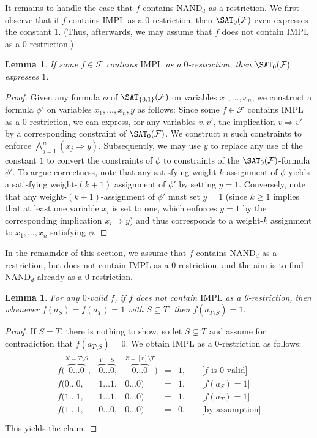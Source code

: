 \documentclass[10pt,a4paper]{article}
\theoremstyle{plain}
\newtheorem{lem}[thm]{Lemma}
\newcommand{\NAND}{\mathrm{NAND}}
\newcommand{\Impl}{\mathrm{IMPL}}
\newcommand{\confam}{\mathcal{F}}
\newcommand{\entry}[1]{#1 \dots #1}
\begin{document}
%
%
It remains to handle the case that $f$ contains $\NAND_d$ as a restriction.
We first observe that if $f$ contains $\Impl$ as a $0$-restriction, then $\SAT_0(\confam)$ even expresses the constant $1$. (Thus, afterwards, we may assume that $f$ does not contain $\Impl$ as a 0-restriction.)
%
\begin{lem}\label{lem:0validexpresses1}
If some $f\in \confam$ contains $\Impl$ as a $0$-restriction, then $\SAT_0(\confam)$ expresses $1$. 
\end{lem}
\begin{proof}
Given any formula $\phi$ of $\SAT_{\{0,1\}}(\confam)$ on variables $x_1,\dots,x_n$, we construct a formula $\phi'$ on variables $x_1,\dots, x_n, y$ as follows: Since some $f\in \confam$ contains $\Impl$ as a $0$-restriction, we can express, for any variables $v,v'$, the implication $v \Rightarrow v'$ by a corresponding constraint of $\SAT_0(\confam)$. We construct $n$ such constraints to enforce $\bigwedge_{j=1}^{n} (x_j\Rightarrow  y)$. Subsequently, we may use $y$ to replace any use of the constant $1$ to convert the constraints of $\phi$ to constraints of the $\SAT_{0}(\confam)$-formula $\phi'$. 
%
To argue correctness, note that any satisfying weight-$k$ assignment of $\phi$ yields a satisfying weight-$(k+1)$ assignment of $\phi'$ by setting $y=1$. Conversely, note that any weight-$(k+1)$-assignment of $\phi'$ must set $y=1$ (since $k\ge 1$ implies that at least one variable $x_i$ is set to one, which enforces $y=1$ by the corresponding implication $x_i \Rightarrow y$) and thus corresponds to a weight-$k$ assignment to $x_1,\dots, x_n$ satisfying $\phi$. 
\end{proof}
%
%
%
%
%
In the remainder of this section, we assume that $f$ contains $\NAND_d$ as a restriction, but does not contain $\Impl$ as a $0$-restriction, and the aim is to find $\NAND_d$ already as a $0$-restriction.
%
%
\begin{lem}\label{lem:subsetdiff}
For any $0$-valid $f$, if $f$ does not contain $\Impl$ as a 0-restriction, then whenever $f(a_S) = f(a_T) = 1$ with $S\subseteq T$, then $f(a_{T\setminus S}) = 1$.
\end{lem}
\begin{proof}
If $S=T$, there is nothing to show, so let $S\subsetneq T$ and assume for contradiction that $f(a_{T\setminus S}) = 0$. We obtain $\Impl$ as a 0-restriction as follows:
\begin{align*}
\begin{matrix}
f( \overbrace{\entry{0}}^{X=T\setminus S},& \overbrace{\entry{0}}^{Y=S}, & \overbrace{\entry{0}}^{Z=[r]\setminus T}) & = & 1, & \quad \text{[$f$ is $0$-valid]}\\
f( \entry{0},& \entry{1}, & \entry{0}) & = & 1, & \quad\text{[$f(a_S)=1$]}\\
f( \entry{1},& \entry{1}, & \entry{0}) & = & 1, & \quad\text{[$f(a_T)=1$]}\\
  \hline
f( \entry{1},& \entry{0}, & \entry{0}) & = & 0. & \quad\text{[by assumption]}\\
\end{matrix}
\end{align*}
This yields the claim.
\end{proof}
\end{document}
